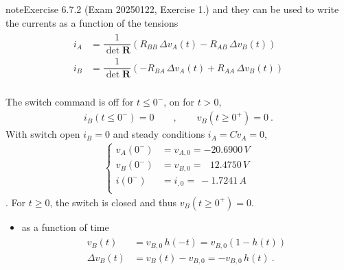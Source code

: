 \documentclass[letterpaper,10pt,english]{jupyterBook}
\begin{document}
\begin{sphinxadmonition}{note}{Exercise 6.7.2 (Exam 2025\sphinxhyphen{}01\sphinxhyphen{}22, Exercise 1.)}
\sphinxAtStartPar
and they can be used to write the currents as a function of the tensions
\begin{equation*}
\begin{split}\begin{aligned}
  i_A & = \dfrac{1}{\det \mathbf{R}} \left( R_{BB} \, \Delta v_A(t) - R_{AB} \, \Delta v_B(t) \right) \\
  i_B & = \dfrac{1}{\det \mathbf{R}} \left(-R_{BA} \, \Delta v_A(t) + R_{AA} \, \Delta v_B(t) \right) \\
\end{aligned}\end{split}
\end{equation*}


\sphinxAtStartPar
The switch command is off for \(t \le 0^-\), on for \(t > 0\),
\begin{equation*}
\begin{split}i_B(t \le 0^{-}) = 0 \qquad , \qquad v_B (t \ge 0^+) = 0 \ .\end{split}
\end{equation*}
\sphinxAtStartPar
{} With switch open \(i_B = 0\) and steady conditions \(i_A = C \dot{v}_A = 0\),
\begin{equation*}
\begin{split}\begin{cases}
  v_A(0^-) & = v_{A,0} =     - 20.6900 \, V \\
  v_B(0^-) & = v_{B,0} = \ \ \ 12.4750 \, V \\
    i(0^-) & = i_{ ,0} = \    - 1.7241 \, A \\
\end{cases}\end{split}
\end{equation*}
\sphinxAtStartPar
{}. For \(t \ge 0\), the switch is closed and thus \(v_B(t\ge 0^+) = 0\).
\begin{itemize}
\item {} 
\sphinxAtStartPar
{} as a function of time
\begin{equation*}
\begin{split}\begin{aligned}
     v_{B}(t) & = v_{B,0} \, h(-t) = v_{B,0} ( 1 - h(t) ) \\
     \Delta v_B(t) & = v_{B}(t) - v_{B,0} = - v_{B,0} \,  h(t) \ . 
   \end{aligned}\end{split}

\end{equation*}
\end{itemize}
\end{sphinxadmonition}
\end{document}
